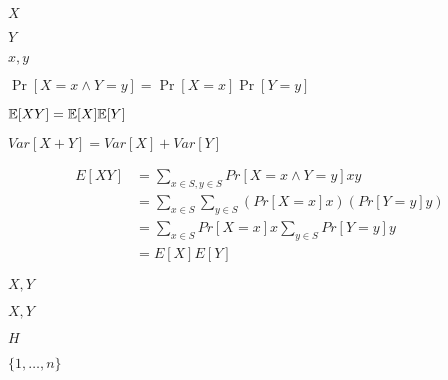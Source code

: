 \documentclass[10pt]{book}
\begin{document}
\begin{mdSnippets}
\begin{mdInlineSnippet}[02129bb861061d1a052c592e2dc6b383]%
$X$\end{mdInlineSnippet}%
\begin{mdInlineSnippet}[57cec4137b614c87cb4e24a3d003a3e0]%
$Y$\end{mdInlineSnippet}%
\begin{mdInlineSnippet}[f10bc3c94b77e1d6b9f98106daf335c1]%
$x,y$\end{mdInlineSnippet}%
\begin{mdInlineSnippet}[270bb75bebec70871a8111324cd1297e]%
$\Pr[X=x \wedge Y=y]=\Pr[X=x]\Pr[Y=y]$\end{mdInlineSnippet}%
\begin{mdInlineSnippet}[18fc1ed2a0cf0ae1509243ff668141cf]%
$\mathbb{E}[XY]=\mathbb{E}[X]\mathbb{E}[Y]$\end{mdInlineSnippet}%
\begin{mdInlineSnippet}[1fe08fb896fc60fabf10d49d66a8406e]%
$Var[X+Y]=Var[X]+Var[Y]$\end{mdInlineSnippet}%
\begin{mdDisplaySnippet}[6e3db3a3cc41ece27e8e945b41a4c70e]%
\[%
\begin{aligned}
E[XY] &= \sum_{x \in S, y \in S} Pr[X = x \wedge Y = y]xy \\
& = \sum_{x \in S} \sum_{y \in S} (Pr[X = x]x) (Pr[Y= y]y) \\
&= \sum_{x \in S} Pr[X = x]x \sum_{y \in S} Pr[Y = y]y \\
&= E[X]E[Y] 
\end{aligned}
\]%
\end{mdDisplaySnippet}%
\begin{mdInlineSnippet}[d23a4ce8bca0f4891e037439a79b45a6]%
$X,Y$\end{mdInlineSnippet}%
\begin{mdInlineSnippet}[d23a4ce8bca0f4891e037439a79b45a6]%
$X,Y$\end{mdInlineSnippet}%
\begin{mdInlineSnippet}[c1d9f50f86825a1a2302ec2449c17196]%
$H$\end{mdInlineSnippet}%
\begin{mdInlineSnippet}[23a94169ff080fcf979759b5152be9fe]%
$\{1,\ldots,n\}$\end{mdInlineSnippet}%

\end{mdSnippets}
\end{document}
